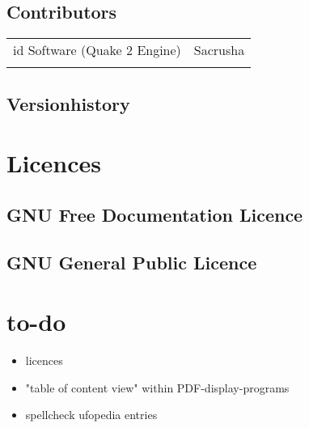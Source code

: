 \subsection{Contributors}

\begin{tabular}{lr}
id Software (Quake 2 Engine)  & Sacrusha 					\\ 
 & \\ 
\end{tabular}
\newpage

\subsection{Versionhistory}

\section{Licences}

\subsection{GNU Free Documentation Licence}
%
\subsection{GNU General Public Licence}

\section{to-do}
\begin{itemize}
\item licences
\item "table of content view" within PDF-display-programs
\item spellcheck ufopedia entries
\end{itemize}
